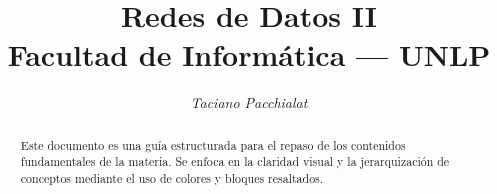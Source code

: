 \documentclass[11pt, a4paper]{article}
\title{
    \vspace{-1.5cm}
    \textbf{\huge Redes de Datos II}\\
    \vspace{0.5cm}
    \large Facultad de Informática --- UNLP
}
\author{\textit{Taciano Pacchialat}}
\date{\the\year}
\begin{document}
\maketitle

\begin{abstract}
    \noindent Este documento es una guía estructurada para el repaso de los contenidos fundamentales de la materia. Se enfoca en la claridad visual y la jerarquización de conceptos mediante el uso de colores y bloques resaltados.
\end{abstract}

\tableofcontents
\newpage



\newpage



\newpage



\newpage



\newpage



\newpage



\newpage



\newpage



\newpage



\newpage



\newpage



\newpage



\newpage



\newpage



\newpage



\newpage
\end{document}
